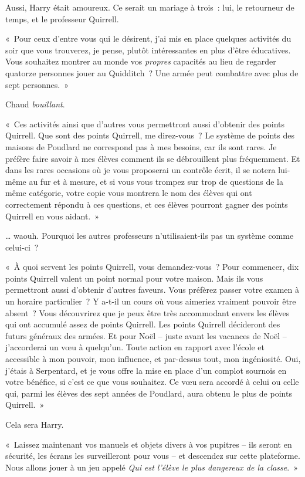 Aussi, Harry était amoureux. Ce serait un mariage à trois~: lui, le retourneur de temps, et le professeur Quirrell.

«~Pour ceux d'entre vous qui le désirent, j'ai mis en place quelques activités du soir que vous trouverez, je pense, plutôt intéressantes en plus d'être éducatives.
Vous souhaitez montrer au monde vos \emph{propres} capacités au lieu de regarder quatorze personnes jouer au Quidditch~?
Une armée peut combattre avec plus de sept personnes.~»

Chaud \emph{bouillant}.

«~Ces activités ainsi que d'autres vous permettront aussi d'obtenir des points Quirrell.
Que sont des points Quirrell, me direz-vous~?
Le système de points des maisons de Poudlard ne correspond pas à mes besoins, car ils sont rares.
Je préfère faire savoir à mes élèves comment ils se débrouillent plus fréquemment.
Et dans les rares occasions où je vous proposerai un contrôle écrit, il se notera lui-même au fur et à mesure, et si vous vous trompez sur trop de questions de la même catégorie, votre copie vous montrera le nom des élèves qui ont correctement répondu à ces questions, et ces élèves pourront gagner des points Quirrell en vous aidant.~»

… waouh. Pourquoi les autres professeurs n'utilisaient-ils pas un système comme celui-ci~?

«~À quoi servent les points Quirrell, vous demandez-vous~?
Pour commencer, dix points Quirrell valent un point normal pour votre maison.
Mais ils vous permettront aussi d'obtenir d'autres faveurs.
Vous préfèrez passer votre examen à un horaire particulier~?
Y a-t-il un cours où vous aimeriez vraiment pouvoir être absent~?
Vous découvrirez que je peux être très accommodant envers les élèves qui ont accumulé assez de points Quirrell.
Les points Quirrell décideront des futurs généraux des armées.
Et pour Noël -- juste avant les vacances de Noël -- j'accorderai un vœu à quelqu'un.
Toute action en rapport avec l'école et accessible à mon pouvoir, mon influence, et par-dessus tout, mon ingéniosité.
Oui, j'étais à Serpentard, et je vous offre la mise en place d'un complot sournois en votre bénéfice, si c'est ce que vous souhaitez.
Ce vœu sera accordé à celui ou celle qui, parmi les élèves des sept années de Poudlard, aura obtenu le plus de points Quirrell.~»

Cela sera Harry.

«~Laissez maintenant vos manuels et objets divers à vos pupitres -- ils seront en sécurité, les écrans les surveilleront pour vous -- et descendez sur cette plateforme.
Nous allons jouer à un jeu appelé \emph{Qui est l'élève le plus dangereux de la classe}.~»


